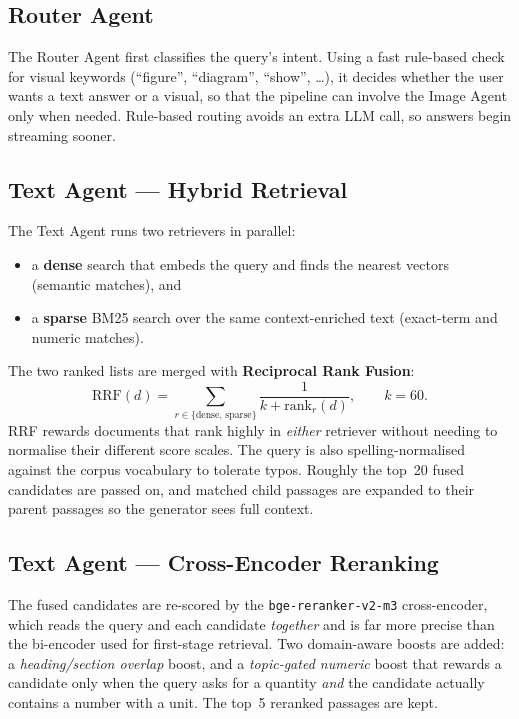 \documentclass[12pt,a4paper]{report}
\begin{document}
\subsection{Router Agent}
The Router Agent first classifies the query's intent. Using a fast rule-based
check for visual keywords (``figure'', ``diagram'', ``show'', \dots), it decides
whether the user wants a text answer or a visual, so that the pipeline can involve
the Image Agent only when needed. Rule-based routing avoids an extra LLM call, so
answers begin streaming sooner.

\subsection{Text Agent --- Hybrid Retrieval}
The Text Agent runs two retrievers in parallel:
\begin{itemize}[leftmargin=1.4em]
  \item a \textbf{dense} search that embeds the query and finds the nearest
        vectors (semantic matches), and
  \item a \textbf{sparse} BM25 search over the same context-enriched text
        (exact-term and numeric matches).
\end{itemize}
The two ranked lists are merged with \textbf{Reciprocal Rank Fusion}:
\begin{equation}
\text{RRF}(d) = \sum_{r \in \{\text{dense},\,\text{sparse}\}} \frac{1}{k + \text{rank}_r(d)}, \qquad k = 60 .
\end{equation}
RRF rewards documents that rank highly in \emph{either} retriever without needing
to normalise their different score scales. The query is also spelling-normalised
against the corpus vocabulary to tolerate typos. Roughly the top~20 fused
candidates are passed on, and matched child passages are expanded to their parent
passages so the generator sees full context.

\subsection{Text Agent --- Cross-Encoder Reranking}
The fused candidates are re-scored by the \texttt{bge-reranker-v2-m3}
cross-encoder, which reads the query and each candidate \emph{together} and is far
more precise than the bi-encoder used for first-stage retrieval. Two domain-aware
boosts are added: a \emph{heading/section overlap} boost, and a \emph{topic-gated
numeric} boost that rewards a candidate only when the query asks for a quantity
\emph{and} the candidate actually contains a number with a unit. The top~5
reranked passages are kept.
\end{document}
